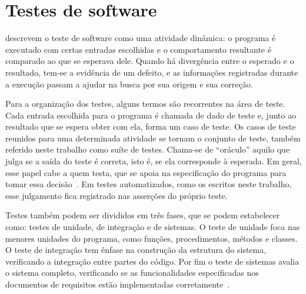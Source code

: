 
\section{Testes de software}

 descrevem o teste de software como uma atividade dinâmica: o programa é executado com certas entradas escolhidas e o comportamento resultante é comparado ao que se esperava dele.
Quando há divergência entre o esperado e o resultado, tem-se a evidência de um defeito, e as informações registradas durante a execução passam a ajudar na busca por sua origem e sua correção.


Para a organização dos testes, alguns termos são recorrentes na área de teste.
Cada entrada escolhida para o programa é chamada de dado de teste e, junto ao resultado que se espera obter com ela, forma um caso de teste.
Os casos de teste reunidos para uma determinada atividade se tornam o conjunto de teste, também referido neste trabalho como suíte de testes.
Chama-se de ``oráculo'' aquilo que julga se a saída do teste é correta, isto é, se ela corresponde à esperada.
Em geral, esse papel cabe a quem testa, que se apoia na especificação do programa para tomar essa decisão~\cite{delamaro2007}.
Em testes automatizados, como os escritos neste trabalho, esse julgamento fica registrado nas asserções do próprio teste.

Testes também podem ser divididos em três fases, que se podem estabelecer como: testes de unidade, de integração e de sistemas.
O teste de unidade foca nas menores unidades do programa, como funções, procedimentos, métodos e classes.
O teste de integração tem ênfase na construção da estrutura do sistema, verificando a integração entre partes do código.
Por fim o teste de sistemas avalia o sistema completo, verificando se as funcionalidades especificadas nos documentos de requisitos estão implementadas corretamente~\cite{valente2020engenharia}.

